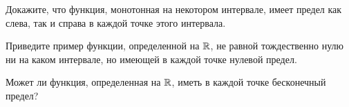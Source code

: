 \documentclass[a4paper, 12pt]{article}
\newcommand{\0}[1]{\overline{#1}}
\begin{document}
 Докажите, что функция, монотонная на некотором интервале,
имеет предел как слева, так и справа в каждой точке этого интервала.



 Приведите пример функции, определенной на $\mathbb{R}$, не равной тождественно
нулю ни на каком интервале, но имеющей в каждой точке нулевой предел.

Может ли функция, определенная на $\mathbb{R}$, иметь в каждой
точке бесконечный предел?




\end{document}
